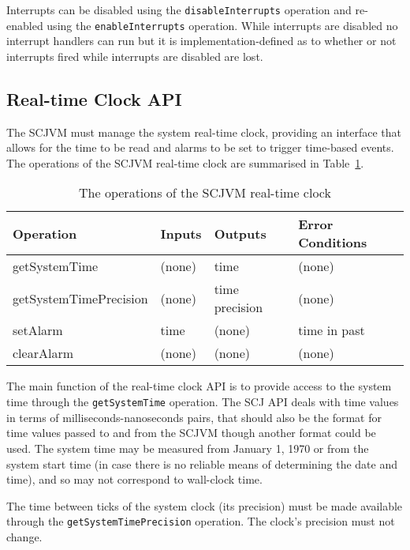 \documentclass[a4paper,10pt]{article}
\begin{document}
Interrupts can be disabled using the \texttt{disable\-Interrupts} operation and
re-enabled using the \texttt{enable\-Interrupts} operation. While interrupts are
disabled no interrupt handlers can run but it is implementation-defined as to
whether or not interrupts fired while interrupts are disabled are lost.

\subsection{Real-time Clock API}
\label{realtime-clock-sec}

The SCJVM must manage the system real-time clock, providing an interface that
allows for the time to be read and alarms to be set to trigger time-based
events. The operations of the SCJVM real-time clock are summarised in
Table~\ref{realtime-clock-table}.

\begin{table}[ht]
  \centering
  \footnotesize
  \begin{tabular}{|l|p{0.9cm}|p{1.8cm}|p{2.3cm}|}
    Operation & Inputs & Outputs & Error Conditions \\
    \hline
    getSystemTime &
      (none) &
      time &
      (none)
    \\getSystemTimePrecision &
      (none) &
      time precision &
      (none)
    \\setAlarm &
      time &
      (none) &
      time in past
    \\clearAlarm &
      (none) &
      (none) &
      (none)
  \end{tabular}
  \caption{The operations of the SCJVM real-time clock}
  \label{realtime-clock-table}
\end{table}

The main function of the real-time clock API is to provide access to the system
time through the \texttt{get\-System\-Time} operation. The SCJ API deals with
time values in terms of milliseconds-nanoseconds pairs, that should also be the
format for time values passed to and from the SCJVM though another format could
be used. The system time may be measured from January 1, 1970 or from the system
start time (in case there is no reliable means of determining the date
and time), and so may not correspond to wall-clock time.

The time between ticks of the system clock (its precision) must be made
available through the \texttt{get\-System\-Time\-Precision} operation. The
clock's precision must not change.
\end{document}
